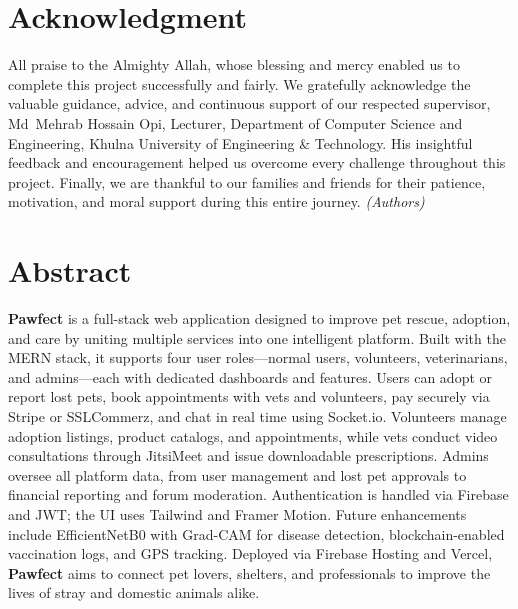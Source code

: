 \documentclass[12pt,a4paper]{report}
\numberwithin{figure}{chapter}
\numberwithin{table}{chapter}
\begin{document}

\chapter*{Acknowledgment}
All praise to the Almighty Allah, whose blessing and mercy enabled us to complete this project successfully and fairly. We gratefully acknowledge the valuable guidance, advice, and continuous support of our respected supervisor, Md~Mehrab Hossain Opi, Lecturer, Department of Computer Science and Engineering, Khulna University of Engineering \& Technology. His insightful feedback and encouragement helped us overcome every challenge throughout this project. Finally, we are thankful to our families and friends for their patience, motivation, and moral support during this entire journey. \textit{(Authors)}

\chapter*{Abstract}
\noindent
\textbf{Pawfect} is a full-stack web application designed to improve pet rescue, adoption, and care by uniting multiple services into one intelligent platform. Built with the MERN stack, it supports four user roles---normal users, volunteers, veterinarians, and admins---each with dedicated dashboards and features. Users can adopt or report lost pets, book appointments with vets and volunteers, pay securely via Stripe or SSLCommerz, and chat in real time using Socket.io. Volunteers manage adoption listings, product catalogs, and appointments, while vets conduct video consultations through JitsiMeet and issue downloadable prescriptions. Admins oversee all platform data, from user management and lost pet approvals to financial reporting and forum moderation. Authentication is handled via Firebase and JWT; the UI uses Tailwind and Framer Motion. Future enhancements include EfficientNetB0 with Grad-CAM for disease detection, blockchain-enabled vaccination logs, and GPS tracking. Deployed via Firebase Hosting and Vercel, \textbf{Pawfect} aims to connect pet lovers, shelters, and professionals to improve the lives of stray and domestic animals alike.
\end{document}
